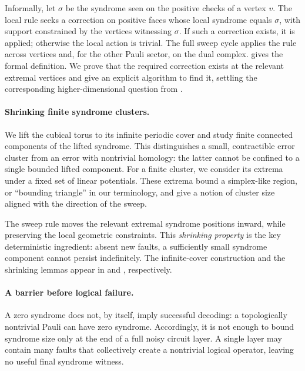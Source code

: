 Informally, let $\sigma$ be the syndrome seen on the positive checks of a vertex $v$.  The local rule seeks a correction on positive faces whose local syndrome equals $\sigma$, with support constrained by the vertices witnessing $\sigma$.  If such a correction exists, it is applied; otherwise the local action is trivial.  The full sweep cycle applies the rule across vertices and, for the other Pauli sector, on the dual complex.   gives the formal definition.  We prove that the required correction exists at the relevant extremal vertices and give an explicit algorithm to find it, settling the corresponding higher-dimensional question from \cite{Kubica_2019}.



\paragraph{Shrinking finite syndrome clusters.}
We lift the cubical torus to its infinite periodic cover and study finite connected components of the lifted syndrome.  This distinguishes a small, contractible error cluster from an error with nontrivial homology: the latter cannot be confined to a single bounded lifted component.  For a finite cluster, we consider its extrema under a fixed set of linear potentials.  These extrema bound a simplex-like region, or ``bounding triangle'' in our terminology, and give a notion of cluster size aligned with the direction of the sweep.

The sweep rule moves the relevant extremal syndrome positions inward, while preserving the local geometric constraints.  This \emph{shrinking property} is the key deterministic ingredient: absent new faults, a sufficiently small syndrome component cannot persist indefinitely.  The infinite-cover construction and the shrinking lemmas appear in  and , respectively.



\paragraph{A barrier before logical failure.}
A zero syndrome does not, by itself, imply successful decoding: a topologically nontrivial Pauli can have zero syndrome.  Accordingly, it is not enough to bound syndrome size only at the end of a full noisy circuit layer.  A single layer may contain many faults that collectively create a nontrivial logical operator, leaving no useful final syndrome witness.

